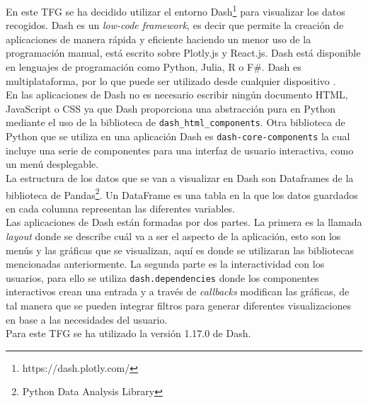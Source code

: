 En este TFG se ha decidido utilizar el entorno Dash\footnote{https://dash.plotly.com/} para visualizar los datos recogidos. Dash es un \textit{low-code framework}, es decir que permite la creación de aplicaciones de manera rápida y eficiente haciendo un menor uso de la programación manual, está escrito sobre Plotly.js y React.js. Dash está disponible en lenguajes de programación como Python, Julia, R o F#. Dash es multiplataforma, por lo que puede ser utilizado desde cualquier dispositivo \cite{dash}.\\
\newpage
En las aplicaciones de Dash no es necesario escribir ningún documento HTML, JavaScript o CSS ya que Dash proporciona una abstracción pura en Python mediante el uso de la biblioteca de \texttt{dash\_html\_components}. Otra biblioteca de Python que se utiliza en una aplicación Dash es \texttt{dash-core-components} la cual incluye una serie de componentes para una interfaz de usuario interactiva, como un menú desplegable.\\

La estructura de los datos que se van a visualizar en  Dash son Dataframes de la biblioteca de Pandas\footnote{Python Data Analysis Library}. Un DataFrame es una tabla en la que los datos guardados en cada columna representan las diferentes variables.\\

Las aplicaciones de Dash están formadas por dos partes. La primera es la llamada \textit{layout} donde se describe cuál va a ser el aspecto de la aplicación, esto son los menús y las gráficas que se visualizan, aquí es donde se utilizaran las bibliotecas mencionadas anteriormente. La segunda parte es la interactividad con los usuarios, para ello se utiliza \texttt{dash.dependencies} donde los componentes interactivos crean una entrada y a través de \textit{callbacks} modifican las gráficas, de tal manera que se pueden integrar filtros para generar diferentes visualizaciones en base a las necesidades del usuario.\\

Para este TFG se ha utilizado la versión 1.17.0 de Dash.















